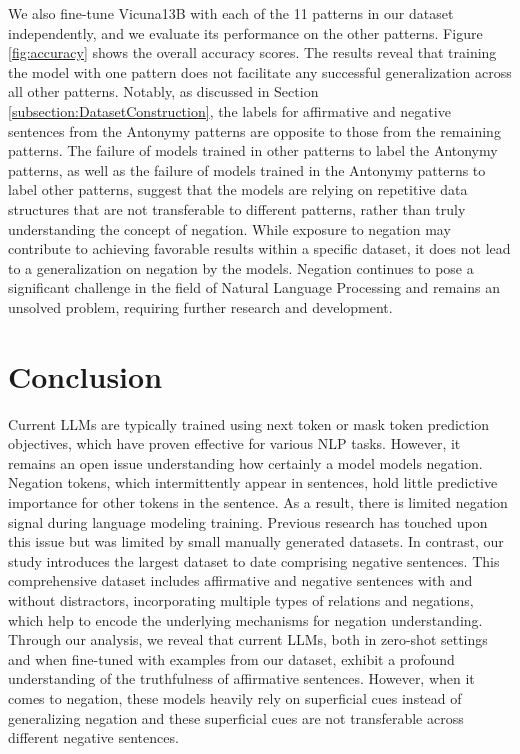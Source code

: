 \documentclass[11pt]{article}
\begin{document}
We also fine-tune Vicuna13B with each of the 11 patterns in our dataset independently, and we evaluate its performance on the other patterns. Figure \ref{fig:accuracy} shows the overall accuracy scores. The results reveal that training the model with one pattern does not facilitate any successful generalization across all other patterns. Notably, as discussed in Section \ref{subsection:DatasetConstruction}, the labels for affirmative and negative sentences from the Antonymy patterns are opposite to those from the remaining patterns. The failure of models trained in other patterns to label the Antonymy patterns, as well as the failure of models trained in the Antonymy patterns to label other patterns, suggest that the models are relying on repetitive data structures that are not transferable to different patterns, rather than truly understanding the concept of negation. While exposure to negation may contribute to achieving favorable results within a specific dataset, it does not lead to a generalization on negation by the models. Negation continues to pose a significant challenge in the field of Natural Language Processing and remains an unsolved problem, requiring further research and development.






\section{Conclusion} \label{sec:Conclusions}

Current LLMs are typically trained using next token or mask token prediction objectives, which have proven effective for various NLP tasks. However, it remains an open issue understanding how certainly a model models negation. Negation tokens, which intermittently appear in sentences, hold little predictive importance for other tokens in the sentence. As a result, there is limited negation signal during language modeling training. Previous research has touched upon this issue but was limited by small manually generated datasets. In contrast, our study introduces the largest dataset to date comprising negative sentences. This comprehensive dataset includes affirmative and negative sentences with and without distractors, incorporating multiple types of relations and negations, which help to encode the underlying mechanisms for negation understanding. Through our analysis, we reveal that current LLMs, both in zero-shot settings and when fine-tuned with examples from our dataset, exhibit a profound understanding of the truthfulness of affirmative sentences. However, when it comes to negation, these models heavily rely on superficial cues instead of generalizing negation and these superficial cues are not transferable across different negative sentences.  
\end{document}
